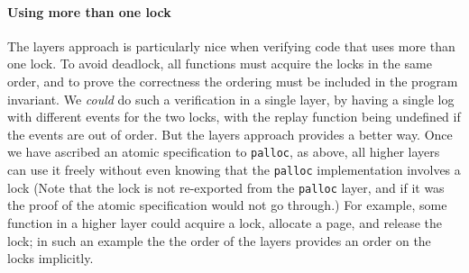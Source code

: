 \paragraph{Using more than one lock}
The layers approach is particularly nice when verifying code that uses more than one
lock. To avoid deadlock, all functions must acquire the locks in the
same order, and to prove the correctness the ordering must be
included in the program invariant. We \emph{could} do such a
verification in a single layer, by having a single log with different
events for the two locks, with the replay function being undefined if
the events are out of order. But the layers approach provides a
better way. Once we have ascribed an atomic specification to
\lstinline$palloc$, as above, all higher layers can use it
freely without even knowing that the \lstinline$palloc$ implementation
involves a lock (Note that the lock is not re-exported from the
\lstinline$palloc$ layer, and if it was the proof of the atomic
specification would not go through.)  For example, some function in a
higher layer could acquire a lock, allocate a page, and release the
lock; in such an example the the order of the layers provides an order
on the locks implicitly.




